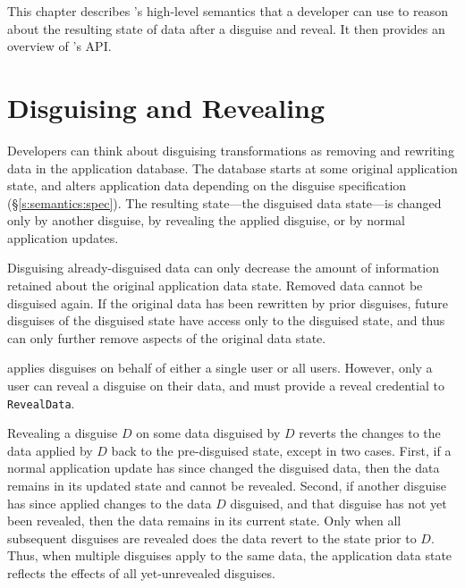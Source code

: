 This chapter describes \sys's high-level semantics that a developer can use to
reason about the resulting state of data after a disguise and reveal. It then
provides an overview of \sys's API.

\section{Disguising and Revealing}
\label{s:semantics:hl}
Developers can think about disguising transformations as removing and rewriting
data in the application database.
%
The database starts at some original application state, and alters application
data depending on the disguise specification (\S\ref{s:semantics:spec}).  The resulting
state---the disguised data state---is changed only by another disguise, by
revealing the applied disguise, or by normal application updates.
%

%
Disguising already-disguised data can only decrease the amount of information
retained about the original application data state. Removed data cannot be
disguised again. If the original data has been rewritten by prior disguises,
future disguises of the disguised state have access only to the disguised state,
and thus can only further remove aspects of the original data state.
%

%
\sys applies disguises on behalf of either a single user or all users. However,
only a user can reveal a disguise on their data, and must provide a reveal
credential to \texttt{RevealData}.
%

%
Revealing a disguise $D$ on some data disguised by $D$ reverts the changes to
the data applied by $D$ back to the pre-disguised state, except in two cases.
First, if a normal application update has since changed the disguised data, then
the data remains in its updated state and cannot be revealed.
%
Second, if another disguise has since applied changes to the data $D$ disguised,
and that disguise has not yet been revealed, then the data remains in its
current state.
%
Only when all subsequent disguises are revealed does the data revert to the
state prior to $D$.
%
Thus, when multiple disguises apply to the same data, the application data state
reflects the effects of all yet-unrevealed disguises.
%

